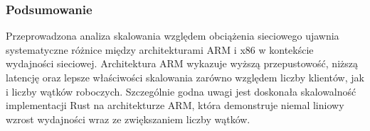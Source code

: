 \subsubsection{Podsumowanie}
Przeprowadzona analiza skalowania względem obciążenia sieciowego ujawnia systematyczne różnice między architekturami ARM i x86 w kontekście wydajności sieciowej. Architektura ARM wykazuje wyższą przepustowość, niższą latencję oraz lepsze właściwości skalowania zarówno względem liczby klientów, jak i liczby wątków roboczych. Szczególnie godna uwagi jest doskonała skalowalność implementacji Rust na architekturze ARM, która demonstruje niemal liniowy wzrost wydajności wraz ze zwiększaniem liczby wątków.